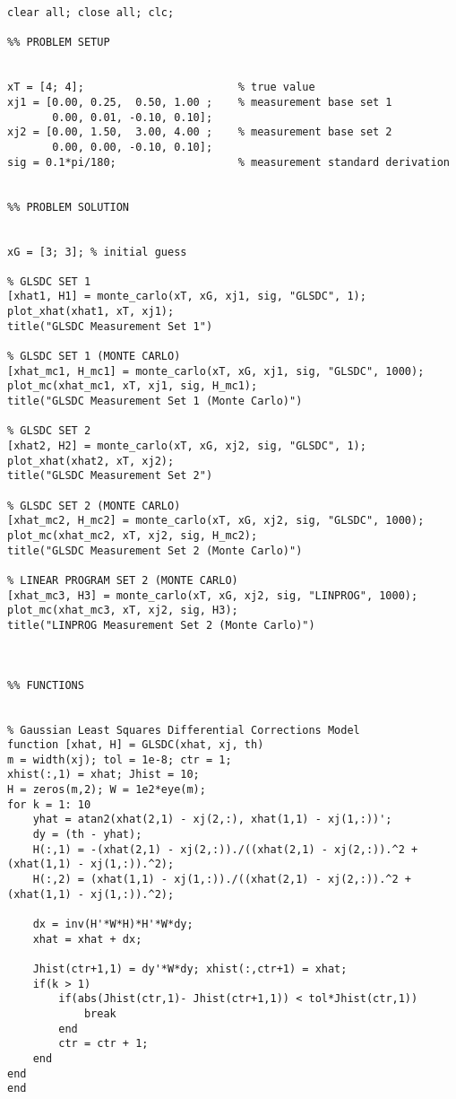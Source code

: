 \documentclass{article}
\begin{document}
\begin{lstlisting}[style=Matlab-editor]
clear all; close all; clc;

%% PROBLEM SETUP


xT = [4; 4];                        % true value
xj1 = [0.00, 0.25,  0.50, 1.00 ;    % measurement base set 1
       0.00, 0.01, -0.10, 0.10];
xj2 = [0.00, 1.50,  3.00, 4.00 ;    % measurement base set 2
       0.00, 0.00, -0.10, 0.10];
sig = 0.1*pi/180;                   % measurement standard derivation


%% PROBLEM SOLUTION


xG = [3; 3]; % initial guess

% GLSDC SET 1
[xhat1, H1] = monte_carlo(xT, xG, xj1, sig, "GLSDC", 1);
plot_xhat(xhat1, xT, xj1);
title("GLSDC Measurement Set 1")

% GLSDC SET 1 (MONTE CARLO)
[xhat_mc1, H_mc1] = monte_carlo(xT, xG, xj1, sig, "GLSDC", 1000);
plot_mc(xhat_mc1, xT, xj1, sig, H_mc1);
title("GLSDC Measurement Set 1 (Monte Carlo)")

% GLSDC SET 2
[xhat2, H2] = monte_carlo(xT, xG, xj2, sig, "GLSDC", 1);
plot_xhat(xhat2, xT, xj2);
title("GLSDC Measurement Set 2")

% GLSDC SET 2 (MONTE CARLO)
[xhat_mc2, H_mc2] = monte_carlo(xT, xG, xj2, sig, "GLSDC", 1000);
plot_mc(xhat_mc2, xT, xj2, sig, H_mc2);
title("GLSDC Measurement Set 2 (Monte Carlo)")

% LINEAR PROGRAM SET 2 (MONTE CARLO)
[xhat_mc3, H3] = monte_carlo(xT, xG, xj2, sig, "LINPROG", 1000);
plot_mc(xhat_mc3, xT, xj2, sig, H3);
title("LINPROG Measurement Set 2 (Monte Carlo)")



%% FUNCTIONS


% Gaussian Least Squares Differential Corrections Model
function [xhat, H] = GLSDC(xhat, xj, th)
m = width(xj); tol = 1e-8; ctr = 1;
xhist(:,1) = xhat; Jhist = 10; 
H = zeros(m,2); W = 1e2*eye(m);
for k = 1: 10
    yhat = atan2(xhat(2,1) - xj(2,:), xhat(1,1) - xj(1,:))';
    dy = (th - yhat);
    H(:,1) = -(xhat(2,1) - xj(2,:))./((xhat(2,1) - xj(2,:)).^2 + (xhat(1,1) - xj(1,:)).^2);
    H(:,2) = (xhat(1,1) - xj(1,:))./((xhat(2,1) - xj(2,:)).^2 + (xhat(1,1) - xj(1,:)).^2);
    
    dx = inv(H'*W*H)*H'*W*dy;
    xhat = xhat + dx;
    
    Jhist(ctr+1,1) = dy'*W*dy; xhist(:,ctr+1) = xhat;
    if(k > 1)
        if(abs(Jhist(ctr,1)- Jhist(ctr+1,1)) < tol*Jhist(ctr,1))
            break
        end
        ctr = ctr + 1;
    end
end
end


\end{lstlisting}
\end{document}
